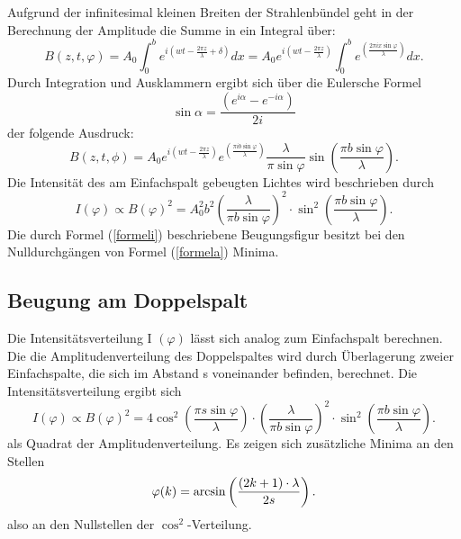 \documentclass[11pt,ngerman,a4paper]{article}
\begin{document}
Aufgrund der infinitesimal kleinen Breiten der Strahlenbündel geht in der Berechnung der Amplitude die Summe in ein Integral über:
\begin{equation}
B (z, t, \varphi) = A_0 \int_0^b {e^{i\left(wt-\frac{2 \pi z}{\lambda}+ \delta \right) } dx} = A_0 e^{i \left( wt- \frac{2 \pi z}{\lambda} \right)} \int_0^b {e^{\left( \frac{2 \pi i x \sin \varphi}{\lambda} \right) }} dx.
\end{equation}
Durch Integration und Ausklammern ergibt sich über die Eulersche Formel
\begin{equation}
\sin \alpha = \frac{\left( e^{i \alpha} - e^{-i \alpha} \right)}{2i}
\end{equation}
der folgende Ausdruck:
\begin{equation}
B (z,t,\phi) = A_0 e^{i\left( wt- \frac{2 \pi z}{\lambda}\right)} e^{\left( \frac{\pi i b \sin \varphi}{\lambda}\right)} \frac{\lambda}{\pi \sin \varphi} \sin \left( \frac{\pi b \sin \varphi}{\lambda} \right).
\label{formela}
\end{equation}
Die Intensität des am Einfachspalt gebeugten Lichtes wird beschrieben durch
\begin{equation}
I (\varphi) \propto B (\varphi)^2 = A_0^2 b^2 \left ( \frac {\lambda}{\pi b \sin \varphi} \right) ^2 \cdot \sin^2 \left( \frac{\pi b \sin \varphi}{\lambda} \right).
\label{formeli}
\end{equation}
Die durch Formel (\ref{formeli}) beschriebene Beugungsfigur besitzt bei den Nulldurchgängen von Formel (\ref{formela}) Minima.
\subsection{Beugung am Doppelspalt}
Die Intensitätsverteilung I $(\varphi)$ lässt sich analog zum Einfachspalt berechnen. Die die Amplitudenverteilung des Doppelspaltes wird durch Überlagerung zweier Einfachspalte, die sich im Abstand s voneinander befinden, berechnet. 
Die Intensitätsverteilung ergibt sich
\begin{equation}
I (\varphi) \propto B(\varphi)^2 = 4 \cos^2 \left( \frac{\pi s \sin \varphi}{\lambda} \right) \cdot \left( \frac{\lambda}{\pi b \sin \varphi} \right)^2 \cdot \sin^2 \left( \frac{\pi b \sin \varphi}{\lambda} \right).
\end{equation}
als Quadrat der Amplitudenverteilung. Es zeigen sich zusätzliche Minima an den Stellen
\begin{equation}
\varphi(k) = \arcsin \left( \frac{(2k+1)\cdot \lambda}{2s} \right) \rm.
\end{equation}
also an den Nullstellen der $\cos^2$-Verteilung.
\end{document}
